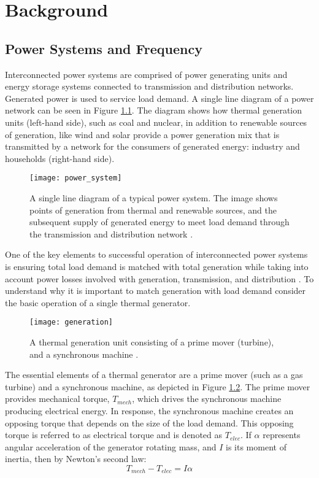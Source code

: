 \chapter{Background}

\section{Power Systems and Frequency}
Interconnected power systems are comprised of power generating units and energy storage systems connected to transmission and distribution networks. Generated power is used to service load demand. A single line diagram of a power network can be seen in Figure \ref{fig:generation}. The diagram shows how thermal generation units (left-hand side), such as coal and nuclear, in addition to renewable sources of generation, like wind and solar provide a power generation mix that is transmitted by a network for the consumers of generated energy: industry and households (right-hand side).
\begin{figure}[ht]
	\centering
	\texttt{[image: power\_system]}
	\caption{A single line diagram of a typical power system. The image shows points of generation from thermal and renewable sources, and the subsequent supply of generated energy to meet load demand through the transmission and distribution network \cite{Glavic2019}.}
	\label{fig:generation}
\end{figure}

One of the key elements to successful operation of interconnected power systems is ensuring total load demand is matched with total generation while taking into account power losses involved with generation, transmission, and distribution \cite{Wood2013}. To understand why it is important to match generation with load demand consider the basic operation of a single thermal generator. 
\begin{figure}[h]
	\centering
	\texttt{[image: generation]}
	\caption{A thermal generation unit consisting of a prime mover (turbine), and a synchronous machine \cite{Wood2013}.}
	\label{fig:turbine}
\end{figure}

The essential elements of a thermal generator are a prime mover (such as a gas turbine) and a synchronous machine, as depicted in Figure \ref{fig:turbine}. The prime mover provides mechanical torque, $T_{mech}$, which drives the synchronous machine producing electrical energy. In response, the synchronous machine creates an opposing torque that depends on the size of the load demand. This opposing torque is referred to as electrical torque and is denoted as $T_{elec}$. If $\alpha$ represents angular acceleration of the generator rotating mass, and $I$ is its moment of inertia, then by Newton's second law:
\begin{equation}
	T_{mech} - T_{elec} = I \alpha \label{eq:1}
\end{equation}

